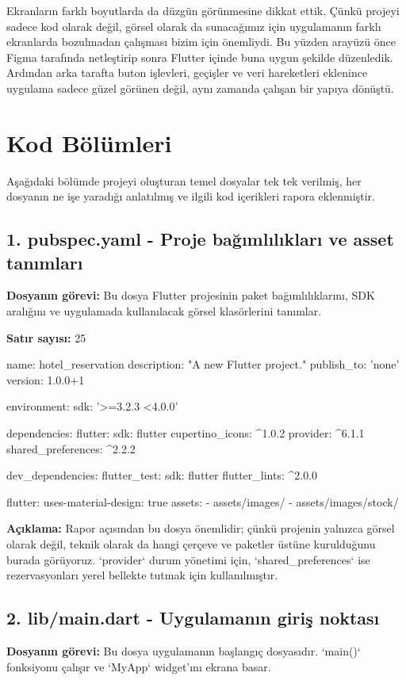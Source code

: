 \documentclass[11pt,a4paper]{article}
\begin{document}
Ekranların farklı boyutlarda da düzgün görünmesine dikkat ettik. Çünkü projeyi sadece kod olarak değil, görsel olarak da sunacağımız için uygulamanın farklı ekranlarda bozulmadan çalışması bizim için önemliydi. Bu yüzden arayüzü önce Figma tarafında netleştirip sonra Flutter içinde buna uygun şekilde düzenledik. Ardından arka tarafta buton işlevleri, geçişler ve veri hareketleri eklenince uygulama sadece güzel görünen değil, aynı zamanda çalışan bir yapıya dönüştü.

\clearpage
\section{Kod Bölümleri}
Aşağıdaki bölümde projeyi oluşturan temel dosyalar tek tek verilmiş, her dosyanın ne işe yaradığı anlatılmış ve ilgili kod içerikleri rapora eklenmiştir.

\clearpage
\subsection{1. pubspec.yaml - Proje bağımlılıkları ve asset tanımları}
\textbf{Dosyanın görevi:} Bu dosya Flutter projesinin paket bağımlılıklarını, SDK aralığını ve uygulamada kullanılacak görsel klasörlerini tanımlar.

\textbf{Satır sayısı:} 25

\begin{codeblock}
name: hotel_reservation
description: "A new Flutter project."
publish_to: 'none'
version: 1.0.0+1

environment:
  sdk: '>=3.2.3 <4.0.0'

dependencies:
  flutter:
    sdk: flutter
  cupertino_icons: ^1.0.2
  provider: ^6.1.1
  shared_preferences: ^2.2.2

dev_dependencies:
  flutter_test:
    sdk: flutter
  flutter_lints: ^2.0.0

flutter:
  uses-material-design: true
  assets:
    - assets/images/
    - assets/images/stock/
\end{codeblock}

\textbf{Açıklama:} Rapor açısından bu dosya önemlidir; çünkü projenin yalnızca görsel olarak değil, teknik olarak da hangi çerçeve ve paketler üstüne kurulduğunu burada görüyoruz. `provider` durum yönetimi için, `shared\_preferences` ise rezervasyonları yerel bellekte tutmak için kullanılmıştır.

\clearpage
\subsection{2. lib/main.dart - Uygulamanın giriş noktası}
\textbf{Dosyanın görevi:} Bu dosya uygulamanın başlangıç dosyasıdır. `main()` fonksiyonu çalışır ve `MyApp` widget'ını ekrana basar.
\end{document}
